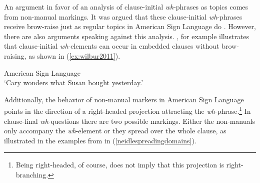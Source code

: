 \begin{exe}
\ex\label{ex:neidleaaronsundcorightwardmovementanalysis} 
\begin{adjustbox}{width=0.9\linewidth}
\end{adjustbox}
\end{exe}

\noindent An argument in favor of an analysis of clause-initial \textit{wh}-phrases as topics comes from non-manual markings. It was argued that these clause-initial \textit{wh}-phrases receive brow-raise just as regular topics in American Sign Language do \citep{neidle1998rightward, neidle2000syntax}. However, there are also arguments speaking against this analysis. \citet{wilbur2011nonmanuals}, for example illustrates that clause-initial \textit{wh}-elements can occur in embedded clauses without brow-raising, as shown in (\ref{ex:wilbur2011}).

\begin{exe}
\ex American Sign Language \citep[160]{wilbur2011nonmanuals} \\  
\glt `Cary wonders what Susan bought yesterday.' \label{ex:wilbur2011} 
\end{exe}

\noindent Additionally, the behavior of non-manual markers in American Sign Language points in the direction of a right-headed projection attracting the \textit{wh}-phrase.\footnote{ Being right-headed, of course, does not imply that this projection is right-branching.} In clause-final \textit{wh}-questions there are two possible markings. Either the non-manuals only accompany the \textit{wh}-element or they spread over the whole clause, as illustrated in the examples from \citet[76]{neidle2002language} in (\ref{neidlespreadingdomains}). 

